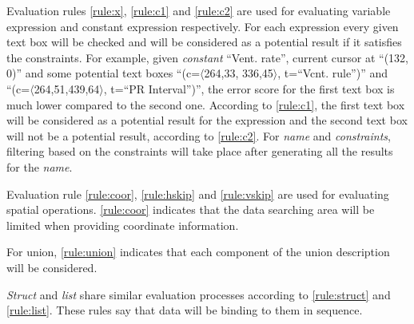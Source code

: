 {Evaluation rules \ref{rule:x}, \ref{rule:c1} and \ref{rule:c2} are used 
for evaluating variable expression and constant expression respectively. 
For each expression every given text box will be checked and will be 
considered as a potential result if it satisfies the constraints. 
For example, given {\em constant} ``Vent. rate'', current cursor at ``(132, 0)'' and some potential text boxes ``(c=$\langle$264,33, 336,45$\rangle$, t=``Vcnt. rule'')'' and ``(c=$\langle$264,51,439,64$\rangle$, t=``PR Interval'')'', the error score for the first text box is much lower compared to the second one. According to \ref{rule:c1}, the first text box will be considered as a potential result 
for the expression and the second text box will not be a potential result, according to \ref{rule:c2}. For {\em name} and {\em constraints}, filtering based on the constraints will take place after generating all the results for the {\em name}. 

Evaluation rule \ref{rule:coor}, \ref{rule:hskip} and \ref{rule:vskip} 
are used for evaluating spatial operations. \ref{rule:coor} indicates that the data searching area 
will be limited when providing coordinate information. 

For union, \ref{rule:union} indicates that each component 
of the union description will be considered. 

{\em Struct} and {\em list} share 
similar evaluation processes according to \ref{rule:struct} and \ref{rule:list}. These rules say 
that data will be binding to them in sequence. 

}%

